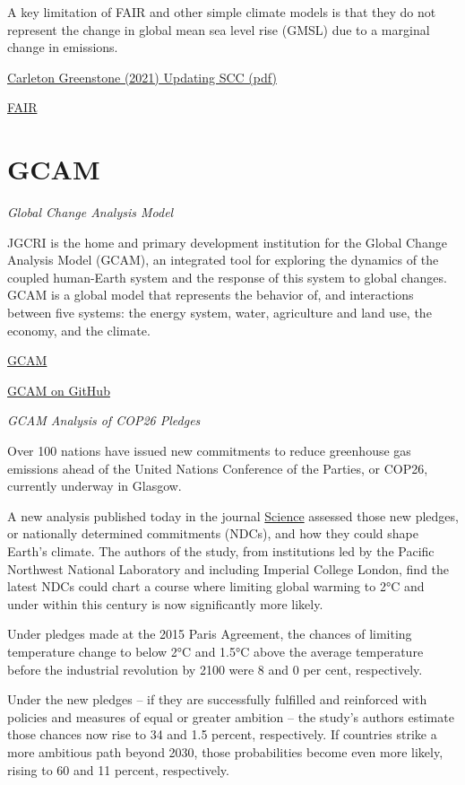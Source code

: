 \documentclass[
]{book}
\begin{document}
A key limitation of FAIR and other simple climate models is that they do not represent
the change in global mean sea level rise (GMSL) due to a marginal change in emissions.

\href{pdf/Greenstone_2021_Updating_SCC.pdf}{Carleton Greenstone (2021) Updating SCC (pdf)}

\href{https://fair.readthedocs.io/en/latest/}{FAIR}

\hypertarget{gcam}{%
\section{GCAM}\label{gcam}}

\emph{Global Change Analysis Model}

JGCRI is the home and primary development institution for the Global Change Analysis Model (GCAM), an integrated tool for exploring the dynamics of the coupled human-Earth system and the response of this system to global changes. GCAM is a global model that represents the behavior of, and interactions between five systems: the energy system, water, agriculture and land use, the economy, and the climate.

\href{http://www.globalchange.umd.edu/gcam/}{GCAM}

\href{https://github.com/JGCRI/gcam-core}{GCAM on GitHub}

\emph{GCAM Analysis of COP26 Pledges}

Over 100 nations have issued new commitments to reduce greenhouse gas emissions ahead of the United Nations Conference of the Parties, or COP26, currently underway in Glasgow.

A new analysis published today in the journal \href{https://www.science.org/doi/10.1126/science.abm1157}{Science} assessed those new pledges, or nationally determined commitments (NDCs), and how they could shape Earth's climate. The authors of the study, from institutions led by the Pacific Northwest National Laboratory and including Imperial College London, find the latest NDCs could chart a course where limiting global warming to 2°C and under within this century is now significantly more likely.

Under pledges made at the 2015 Paris Agreement, the chances of limiting temperature change to below 2°C and 1.5°C above the average temperature before the industrial revolution by 2100 were 8 and 0 per cent, respectively.

Under the new pledges -- if they are successfully fulfilled and reinforced with policies and measures of equal or greater ambition -- the study's authors estimate those chances now rise to 34 and 1.5 percent, respectively. If countries strike a more ambitious path beyond 2030, those probabilities become even more likely, rising to 60 and 11 percent, respectively.
\end{document}
